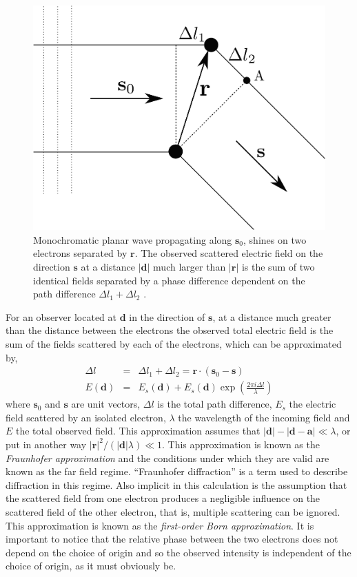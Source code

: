 \begin{figure}[h]
\begin{center}
\includegraphics[width=0.7 \columnwidth]{Diffraction_Theory/two_electrons.png}
\end{center}
\caption{Monochromatic planar wave propagating along $\mathbf s_0$, shines on two
  electrons separated by $\mathbf r$. The observed scattered electric field on the
  direction $\mathbf s$ at a distance $| \mathbf d|$ much larger than $|\mathbf r|$ is the
  sum of two identical fields separated by a phase difference dependent on the
  path difference $\Delta l_1 + \Delta l_2$ \cite{2001International}.}
\label{Fig:two_electrons}
\end{figure}
For an observer located at $\mathbf d$ in the direction of $\mathbf s$, at a distance
much greater than the distance between the electrons the observed total electric
field is the sum of the fields scattered by each of the electrons, which can be
approximated by,
\begin{eqnarray}
\Delta l & = & \Delta l_1 + \Delta l_2 = \mathbf r \cdot (\mathbf s_0 - \mathbf s)\\
E(\mathbf d) & = & E_s(\mathbf d) + E_s(\mathbf d) \exp(\frac{2 \pi i \Delta
  l}{\lambda})
\label{Eq:ScatteringTwoElectrons}
\end{eqnarray}
where $\mathbf s_0$ and $\mathbf s$ are unit vectors, $\Delta l$ is the total path
difference, $E_s$ the electric field scattered by an isolated electron, $\lambda$
the wavelength of the incoming field and $E$ the total observed field.
This approximation assumes that $|\mathbf d| -
|\mathbf d- \mathbf a| \ll \lambda$, or put in another way $|\mathbf r|^2/(|\mathbf d| \lambda) \ll
1 $. This approximation is known as the {\em Fraunhofer approximation} and the conditions
under which they are valid are known as the far field regime. ``Fraunhofer
diffraction'' is a term used to describe diffraction in this regime. Also implicit
in this calculation is the assumption that the scattered field from one electron produces a
negligible influence on the scattered field of the other electron, that is, multiple
scattering can be ignored. This approximation is known as the {\em first-order Born
  approximation}.
It is
important to notice that the relative phase between the two electrons does not
depend on the choice of origin and so the observed intensity is independent of
the choice of origin, as it must obviously be. 


